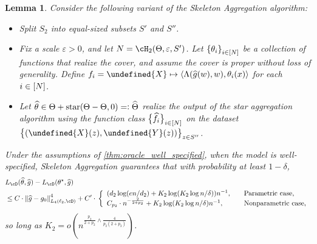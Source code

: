 \documentclass[11pt]{article} %
\newcommand{\journal}[1]{\iftoggle{journal}{#1}{}}
\newcommand{\preprint}[1]{\iftoggle{journal}{}{#1}}
\newcommand{\pref}[1]{\cref{#1}}
\theoremstyle{theorem}  %
\newtheorem{lemma}{Lemma}
\theoremstyle{plain}
\DeclarePairedDelimiter{\brk}{[}{]}
\DeclarePairedDelimiter{\crl}{\{}{\}}
\DeclarePairedDelimiter{\prn}{(}{)}
\DeclarePairedDelimiter{\nrm}{\|}{\|}
\DeclarePairedDelimiter{\tri}{\langle}{\rangle}
\newcommand{\ls}{\ell}
\newcommand{\veps}{\varepsilon}
\newcommand{\rdef}{=\vcentcolon}
\newcommand{\wt}[1]{\widetilde{#1}}
\newcommand{\wh}[1]{\widehat{#1}}
\let\wt\undefined
\newcommand{\wt}[1]{\widetilde{#1}}
\newcommand{\poprisk}{L_{\cD}}
\newcommand{\starhull}{\mathrm{star}}
\newcommand{\auxX}{\wt{X}}
\newcommand{\auxY}{\wt{Y}}
\newcommand{\varone}{w} %
\newcommand{\vartwo}{x} %
\newcommand{\estone}{\wh{g}}
\newcommand{\esttwo}{\wh{\theta}}
\newcommand{\ptwo}{p_2}
\newcommand{\dtwo}{d_2}
\newcommand{\target}{\Theta}
\newcommand{\targetemp}{\wh{\Theta}}
\newcommand{\dimtwo}{K_2}
\newcommand{\besttwo}{\theta^{\star}}
\newcommand{\gtone}{g_0}
\newcommand{\sampletwo}{S_2}
\newcommand{\footnoteorhide}[1]{\preprint{\footnote{#1}}\journal{}}
\begin{document}
\begin{lemma}
\label{lem:skeleton_aggregation}
Consider the following variant of the Skeleton Aggregation algorithm:\footnoteorhide{See \pref{sec:skeleton} for background.}
\begin{itemize}
\item Split $\sampletwo$ into equal-sized subsets $S'$ and $S''$.
\item Fix a scale $\veps>0$, and let $N=\cH_{2}(\target,\veps,S')$. Let $\crl*{\theta_i}_{i\in\brk*{N}}$ be a collection of functions that realize the cover, and assume the cover is proper without loss of generality. Define $f_i = \wt{X}\mapsto{}\tri*{\Lambda(\estone(\varone),\varone),\theta_i(\vartwo)}$ for each $i\in\brk*{N}$.
\item Let $\esttwo\in\target + \starhull(\target-\target,0)\rdef\targetemp$ realize the output of the star aggregation algorithm using the function class $\crl[\big]{\wh{f}_i}_{i\in\brk*{N}}$ on the dataset $\crl[\big]{(\auxX(z),\auxY(z))}_{z\in{}S''}$.%
\end{itemize}
Under the assumptions of \pref{thm:oracle_well_specified}, when the model is well-specified, Skeleton Aggregation guarantees that with probability at least $1-\delta$,
\begin{align*}
&\poprisk(\esttwo,\estone) - \poprisk(\besttwo,\estone) \\
&\leq C\cdot\nrm*{\estone-\gtone}_{L_4(\ls_2,\cD)}^{4} + C'\cdot{}\left\{
\begin{array}{ll}
\prn*{\dtwo\log(en/\dtwo) + \dimtwo\log(\dimtwo\log{}n/\delta)}n^{-1},\quad&\text{Parametric case,}\\
C_{\ptwo}\cdot{}n^{-\frac{2}{2+\ptwo}} + \dimtwo\log(\dimtwo\log{}n/\delta)n^{-1},\quad&\text{Nonparametric case,}
\end{array}
\right.
\end{align*}
so long as $\dimtwo=o(n^{\frac{\ptwo}{2+\ptwo}\wedge\frac{4}{\ptwo(2+\ptwo)}})$.

%
\end{lemma}
\end{document}
